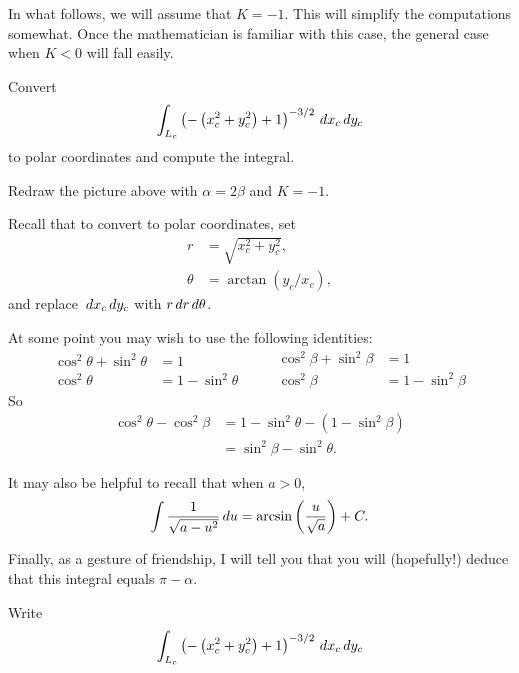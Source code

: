 \documentclass{ximera}
\begin{document}
In what follows, we will assume that $K=-1$. This will simplify the
computations somewhat. Once the mathematician is familiar with this
case, the general case when $K<0$ will fall easily.


\begin{problem}
  Convert
  \[
  \int_{L_c} \left(-\left(x_c^2+y_c^2\right)+1\right)^{-3/2} \,d x_c\,d y_c
  \]
  to polar coordinates and compute the integral.
  \begin{hint}
    Redraw the picture above with $\alpha = 2\beta$ and $K=-1$.
  \end{hint}
  \begin{hint}
    Recall that to convert to polar coordinates, set
    \begin{align*}
      r &= \sqrt{x_c^2+y_c^2},\\
      \theta &= \arctan(y_c/x_c),
    \end{align*}
    and replace $\,d x_c\,d y_c$ with $r\,d r\,d \theta$.
  \end{hint}
  \begin{hint}
    At some point you may wish to use the following identities:
    \[
    \begin{split}
      \cos^2\theta + \sin^2\theta &=1\\
      \cos^2\theta &= 1-\sin^2\theta
    \end{split}
    \qquad
    \begin{split}
      \cos^2\beta + \sin^2\beta &=1\\
      \cos^2\beta &= 1-\sin^2\beta
    \end{split}
    \]
    So
    \begin{align*}
      \cos^2\theta - \cos^2\beta &= 1 - \sin^2\theta - \left(1-\sin^2\beta\right)\\
      &= \sin^2\beta - \sin^2\theta.       
    \end{align*}
  \end{hint}
  \begin{hint}
    It may also be helpful to recall that when $a>0$,
    \[
    \int \frac{1}{\sqrt{a - u^2}} \,d u = \arcsin\left(\frac{u}{\sqrt{a}}\right) + C.
    \]
  \end{hint}
  \begin{hint}
    Finally, as a gesture of friendship, I will tell you that you will
    (hopefully!) deduce that this integral equals $\pi-\alpha$.
  \end{hint}
  \begin{freeResponse}
    Write
    \[
    \int_{L_c} \left(-\left(x_c^2+y_c^2\right)+1\right)^{-3/2} \,d x_c\,d y_c
\]
\end{freeResponse}
\end{problem}
\end{document}
